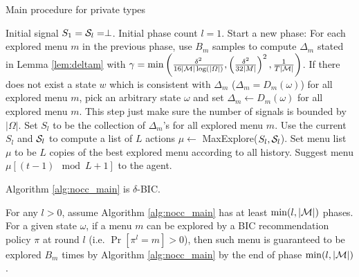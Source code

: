  \begin{algorithm}[H]
    \caption{Main procedure for private types }
    	\label{alg:nocc_main}
    \begin{algorithmic}[1]
    	\STATE Initial signal $S_1 = \S_l= \perp$.
	\STATE Initial phase count $l = 1$. 
			\STATE Start a new phase:
			\STATE For each explored menu $m$ in the previous phase, use $B_m$ samples to compute $\Delta_m$ stated in Lemma \ref{lem:deltam} with $\gamma =\min\left(\frac{\delta^2}{16|\M|\log(|\varOmega|)},\left( \frac{\delta^2}{32|M|}\right)^2, \frac{1}{T|\M|}\right)$. 
			\STATE If there does not exist a state $w$ which is consistent with $\Delta_m$ ($\Delta_m = D_m(\omega)$) for all explored menu $m$, pick an arbitrary state $\omega$ and set $\Delta_m \leftarrow D_m(\omega)$ for all explored menu $m$. This step just make sure the number of signals is bounded by $|\varOmega|$.
			\STATE Set $S_l$ to be the collection of $\Delta_m$'s for all explored menu $m$.
				\STATE Use the current $S_l$ and $\S_l$ to compute a list of $L$ actions $\mu \leftarrow $ MaxExplore($S_l, \S_l$).
			\ELSE
				\STATE Set menu list $\mu$ to be $L$ copies of the best explored menu according to all history. 
			\ENDIF
		\ENDIF
		\STATE Suggest menu $\mu [ (t-1) \mod L + 1]$ to the agent.
	\ENDFOR
     \end{algorithmic}
\end{algorithm}


\begin{claim}
\label{clm:nocc_BIC}
Algorithm \ref{alg:nocc_main} is $\delta$-BIC.
\end{claim}


\begin{lemma}
\label{lem:exp_nocc}
For any $l > 0$, assume Algorithm \ref{alg:nocc_main} has at least $\min(l, |\M|)$ phases. 
For a given state $\omega$, if a menu $m$ can be explored by a BIC recommendation policy $\pi$ at round $l$ (i.e. $ \Pr[\pi^l= m]> 0$), then such menu is guaranteed to be explored $B_m$ times by Algorithm \ref{alg:nocc_main} by the end of phase $\min(l, |\M|)$. 
\end{lemma}

